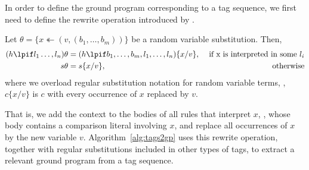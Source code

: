 

In order to define the ground program corresponding to a tag sequence, we first need to define the rewrite operation introduced by \trvone.
\begin{definition}[RV substitution]\label{def:context-substitution}
	Let $\theta=\{x\twoheadleftarrow (v, (b_1, \dots ,b_m))\}$ be a random variable substitution. Then,
	\begin{align*}
		(h \lpif l_1\dots, l_n)\theta &= (h\lpif b_1, \dots, b_m,l_1, \dots, l_n)\{x/v\}, &\text{~if~x~is~interpreted~in~some~}l_i\\
		s\theta &= s\{x/v\}, &\text{~otherwise}
	\end{align*}
	where we overload regular substitution notation for random variable terms, \ie, $c\{x/v\}$ is $c$ with every occurrence of $x$ replaced by $v$.
\end{definition}
That is, we add the  context to the bodies of all rules that interpret $x$, \ie, whose body contains a comparison literal involving $x$, and replace all occurrences of $x$ by the new variable $v$.
Algorithm~\ref{alg:tags2gp} uses this rewrite operation, together with regular substitutions included in other types of tags, to extract a relevant ground program from a tag sequence. 



